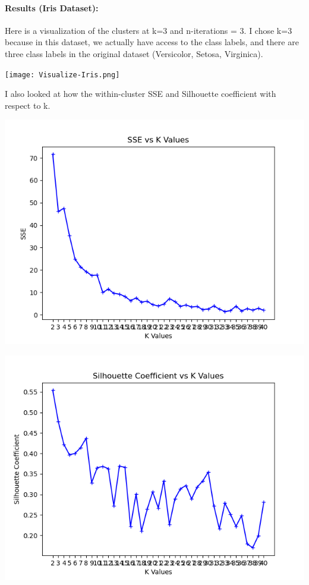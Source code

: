 \documentclass{article}
\begin{document}
\paragraph{\textbf{Results (Iris Dataset):}} 
Here is a visualization of the clusters at k=3 and n-iterations = 3. I chose k=3 because in this dataset, we actually have access to the class labels, and there are three class labels in the original dataset (Versicolor, Setosa, Virginica). 

\texttt{[image: Visualize-Iris.png]}

I also looked at how the within-cluster SSE and Silhouette coefficient with respect to k. 

\includegraphics[scale=0.6]{SSE-plot-iris.png}

\includegraphics[scale=0.6]{Silhouette-plot-iris.png}
\end{document}
